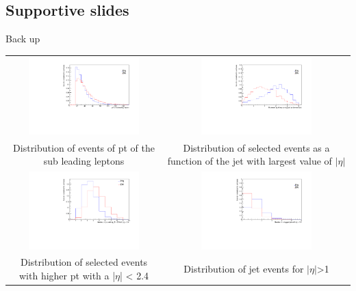 \documentclass[11pt]{beamer}
\newcommand\Fontvi{\fontsize{4}{7.2}\selectfont}
\newcommand{\nologo}{\setbeamertemplate{logo}{}}
\begin{document}
\begin{frame}
\section{Supportive slides}
\huge{Back up}
\end{frame}

{\nologo
	\begin{frame}
		\Fontvi
		\begin{center}
			\begin{tabular}{cc}
				\includegraphics[width=5.5cm,height=3cm]{figures/distributions/compare_variables-pt-sub} &
				\includegraphics[width=5.5cm,height=3cm]{figures/distributions/compare_variables-abs-pj-eta}\\ 
				{Distribution of events of pt of the sub leading leptons} &{Distribution of selected events as a function of the jet with largest value of $|\eta|$}\\
				\includegraphics[width=5.5cm,height=3cm]{figures/distributions/compare_variablescompare_variables-ncj24}&
				\includegraphics[width=5.5cm,height=3cm]{figures/distributions/compare_variables-nfj}\\		
				{Distribution of selected events with higher pt with a |$\eta$| < 2.4 } & {Distribution of jet events for $|\eta|$>1 } \\
			\end{tabular}
		\end{center}
	\end{frame}
}
\end{document}
